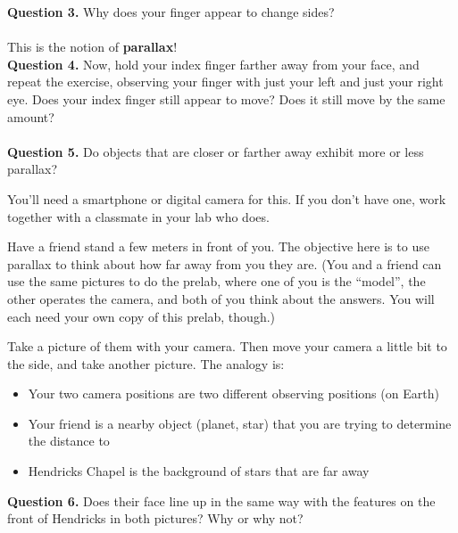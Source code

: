 \documentclass[11pt]{article}
\begin{document}
\textbf{Question 3.} Why does your finger appear to change sides?\\

\vspace*{1.5cm}
\hrulefill\\
This is the notion of \textbf{parallax}! \\

\textbf{Question 4.} Now, hold your index finger farther away from your face, and repeat the exercise, observing your finger with just your left and just your right eye. Does your index finger still appear to move? Does it still move by the same amount?\\

\vspace*{1.5cm}
\hrulefill\\

\textbf{Question 5.} Do objects that are closer or farther away exhibit more or less parallax?\\

\vspace*{1.5cm}
\hrulefill

\newpage

You'll need a smartphone or digital camera for this. If you don't have one, work together with a classmate in your lab who does. 

Have a friend stand a few meters in front of you. The objective here is to use parallax to think about how far away from you they are. (You and a friend can use the same pictures to do the prelab, where one of you is the ``model'', the other operates the camera, and both of you think about the answers. You will each need your own copy of this prelab, though.)

Take a picture of them with your camera. Then move your camera a little bit to the side, and take another picture. The analogy is:

\begin{itemize}
	\item Your two camera positions are two different observing positions (on Earth)
	\item Your friend is a nearby object (planet, star) that you are trying to determine the distance to
	\item Hendricks Chapel is the background of stars that are far away
	\end{itemize}

\textbf{Question 6.} Does their face line up in the same way with the features on the
front of Hendricks in both pictures? Why or why not?\\
\end{document}
